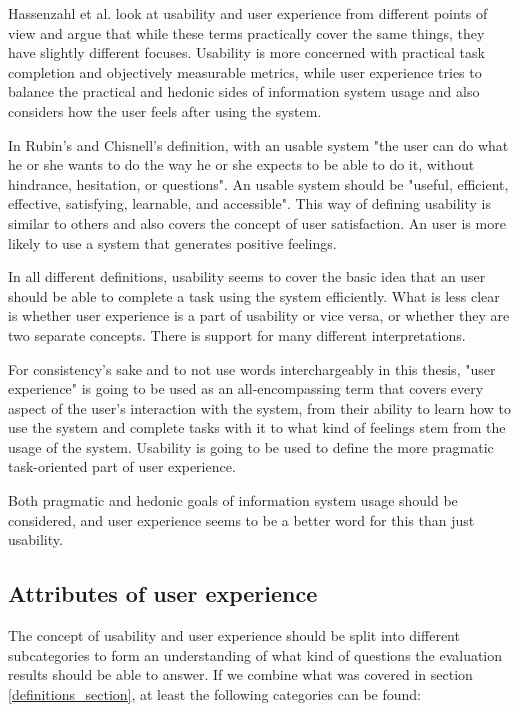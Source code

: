 Hassenzahl et al. look at usability and user experience from different points of view and argue that while these terms practically cover the same things, they have slightly different focuses. Usability is more concerned with practical task completion and objectively measurable metrics, while user experience tries to balance the practical and hedonic sides of information system usage and also considers how the user feels after using the system.
\cite{hassenzahl2006user}

In Rubin's and Chisnell's definition, with an usable system "the user can do what he or she wants to do the way he or she expects to be able to do it, without hindrance, hesitation, or questions". An usable system should be "useful, efficient, effective, satisfying, learnable, and accessible". \cite{rubin2008handbook} This way of defining usability is similar to others and also covers the concept of user satisfaction. An user is more likely to use a system that generates positive feelings.

In all different definitions, usability seems to cover the basic idea that an user should be able to complete a task using the system efficiently. What is less clear is whether user experience is a part of usability or vice versa, or whether they are two separate concepts. There is support for many different interpretations.

For consistency's sake and  to not use words interchargeably in this thesis, "user experience" is going to be used as an all-encompassing term that covers every aspect of the user's interaction with the system, from their ability to learn how to use the system and complete tasks with it to what kind of feelings stem from the usage of the system. Usability is going to be used to define the more pragmatic task-oriented part of user experience.

Both pragmatic and hedonic goals of information system usage should be considered, and user experience seems to be a better word for this than just usability.

\subsection{Attributes of user experience}\label{usability_attributes}
The concept of usability and user experience should be split into different subcategories to form an understanding of what kind of questions the evaluation results should be able to answer. If we combine what was covered in section \ref{definitions_section}, at least the following categories can be found:

